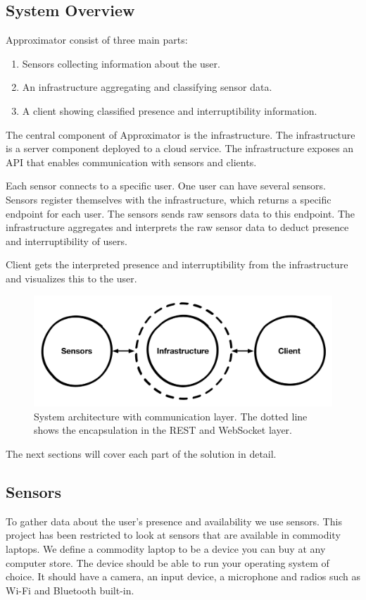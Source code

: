 \documentclass{sigchi}
\begin{document}
\subsection{System Overview}
Approximator consist of three main parts:
\begin{enumerate}
  \item Sensors collecting information about the user.
  \item An infrastructure aggregating and classifying sensor data.
  \item A client showing classified presence and interruptibility information.
\end{enumerate}

The central component of Approximator is the infrastructure.
The infrastructure is a server component deployed to a cloud service.
The infrastructure exposes an API that enables communication with sensors and clients.

Each sensor connects to a specific user.
One user can have several sensors.
Sensors register themselves with the infrastructure, which returns a specific endpoint for each user.
The sensors sends raw sensors data to this endpoint.
The infrastructure aggregates and interprets the raw sensor data to deduct presence and interruptibility of users.

Client gets the interpreted presence and interruptibility from the infrastructure and visualizes this to the user.

\begin{figure}[H]
  \centering
  \includegraphics[width=\columnwidth]{figures/system_architecture.pdf}
  \caption{System architecture with communication layer. The dotted line shows the encapsulation in the REST and WebSocket layer.}
  \label{fig:architecture}
\end{figure}

The next sections will cover each part of the solution in detail.

\subsection{Sensors}
To gather data about the user's presence and availability we use sensors.
This project has been restricted to look at sensors that are available in commodity laptops.
We define a commodity laptop to be a device you can buy at any computer store.
The device should be able to run your operating system of choice.
It should have a camera, an input device, a microphone and radios such as Wi-Fi and Bluetooth built-in.
\end{document}
